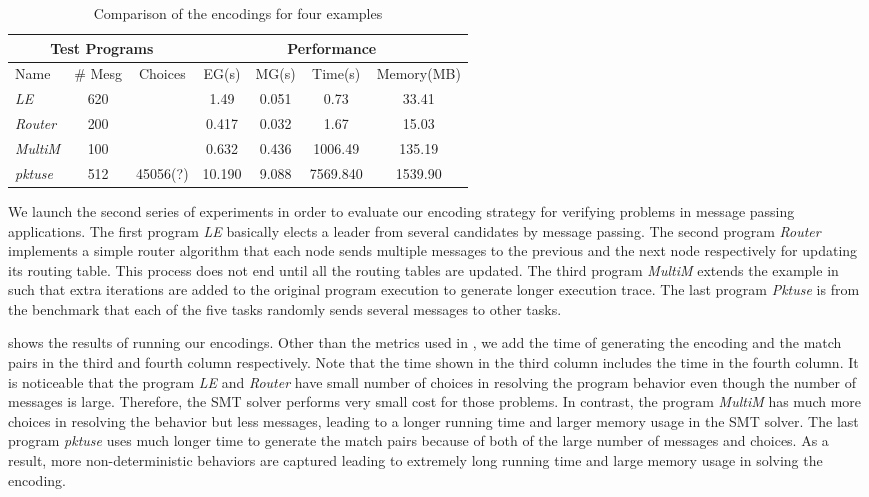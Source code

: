 \begin{table}
\begin{center}
\setlength{\tabcolsep}{2pt}
\scriptsize
\begin{tabular}{|l|c|c|c|c|c|c|}
		\hline
         \multicolumn{3}{|c|}{Test Programs} & \multicolumn{4}{|c|}{Performance} \\ \hline
         Name & \# Mesg & Choices & EG(s) & MG(s) & Time(s) & Memory(MB) \\ \hline
         \textit{LE} & 620 & & 1.49 & 0.051 & 0.73 & 33.41  \\
         \textit{Router} & 200 & & 0.417 & 0.032 & 1.67 & 15.03  \\
         \textit{MultiM} & 100 &  & 0.632 & 0.436 &  1006.49 & 135.19  \\
         \textit{pktuse} & 512 & 45056(?) & 10.190 & 9.088 & 7569.840 & 1539.90 \\
         \hline
		\end{tabular}
\end{center}
\caption{Comparison of the encodings for four examples}
\label{table:second}
\end{table}
We launch the second series of experiments in order to evaluate our encoding strategy for verifying problems in message passing applications. The first program \textit{LE} basically elects a leader from several candidates by message passing. The second program \textit{Router} implements a simple router algorithm that each node sends multiple messages to the previous and the next node respectively for updating its routing table. This process does not end until all the routing tables are updated. The third program \textit{MultiM} extends the example in  such that extra iterations are added to the original program execution to generate longer execution trace. The last program \textit{Pktuse} is from the benchmark \cite{mpptest_benchmark} that each of the five tasks randomly sends several messages to other tasks.

 shows the results of running our encodings. Other than the metrics used in , we add the time of generating the encoding and the match pairs in the third and fourth column respectively. Note that the time shown in the third column includes the time in the fourth column. It is noticeable that the program \textit{LE} and \textit{Router} have small number of choices in resolving the program behavior even though the number of messages is large. Therefore, the SMT solver performs very small cost for those problems. In contrast, the program \textit{MultiM} has much more choices in resolving the behavior but less messages, leading to a longer running time and larger memory usage in the SMT solver. The last program \textit{pktuse} uses much longer time to generate the match pairs because of both of the large number of messages and choices. As a result, more non-deterministic behaviors are captured leading to extremely long running time and large memory usage in solving the encoding.

